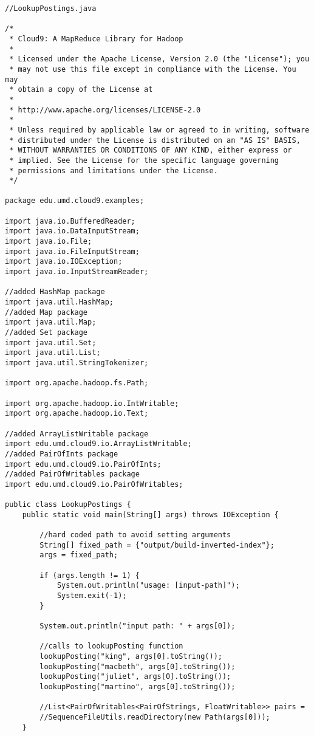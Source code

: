 \documentclass{article} %
\begin{document}
\begin{lstlisting}[style=Java]
//LookupPostings.java

/*
 * Cloud9: A MapReduce Library for Hadoop
 * 
 * Licensed under the Apache License, Version 2.0 (the "License"); you
 * may not use this file except in compliance with the License. You may
 * obtain a copy of the License at
 *
 * http://www.apache.org/licenses/LICENSE-2.0
 *
 * Unless required by applicable law or agreed to in writing, software
 * distributed under the License is distributed on an "AS IS" BASIS,
 * WITHOUT WARRANTIES OR CONDITIONS OF ANY KIND, either express or
 * implied. See the License for the specific language governing
 * permissions and limitations under the License.
 */

package edu.umd.cloud9.examples;

import java.io.BufferedReader;
import java.io.DataInputStream;
import java.io.File;
import java.io.FileInputStream;
import java.io.IOException;
import java.io.InputStreamReader;

//added HashMap package
import java.util.HashMap;
//added Map package
import java.util.Map;
//added Set package
import java.util.Set;
import java.util.List;
import java.util.StringTokenizer;

import org.apache.hadoop.fs.Path;

import org.apache.hadoop.io.IntWritable;
import org.apache.hadoop.io.Text;

//added ArrayListWritable package
import edu.umd.cloud9.io.ArrayListWritable;
//added PairOfInts package
import edu.umd.cloud9.io.PairOfInts;
//added PairOfWritables package
import edu.umd.cloud9.io.PairOfWritables;

public class LookupPostings {
	public static void main(String[] args) throws IOException {
		
		//hard coded path to avoid setting arguments
		String[] fixed_path = {"output/build-inverted-index"};
		args = fixed_path;
		
		if (args.length != 1) {
			System.out.println("usage: [input-path]");
			System.exit(-1);
		}
		
		System.out.println("input path: " + args[0]);
		
		//calls to lookupPosting function
		lookupPosting("king", args[0].toString());
		lookupPosting("macbeth", args[0].toString());
		lookupPosting("juliet", args[0].toString());
		lookupPosting("martino", args[0].toString());

		//List<PairOfWritables<PairOfStrings, FloatWritable>> pairs =
		//SequenceFileUtils.readDirectory(new Path(args[0]));
	}


\end{lstlisting}
\end{document}
